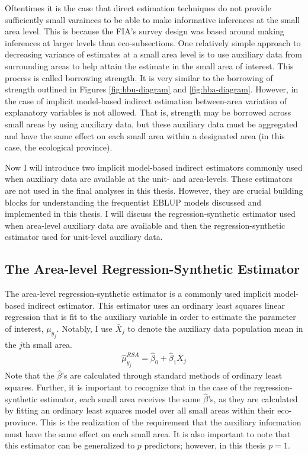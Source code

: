 \documentclass[12pt,twoside]{reedthesis}
\begin{document}
Oftentimes it is the case that direct estimation techniques do not provide sufficiently small varainces to be able to make informative inferences at the small area level. This is because the FIA's survey design was based around making inferences at larger levels than eco-subsections. One relatively simple approach to decreasing variance of estimates at a small area level is to use auxiliary data from surrounding areas to help attain the estimate in the small area of interest. This process is called borrowing strength. It is very similar to the borrowing of strength outlined in Figures \ref{fig:hbu-diagram} and \ref{fig:hba-diagram}. However, in the case of implicit model-based indirect estimation between-area variation of explanatory variables is not allowed. That is, strength may be borrowed across small areas by using auxiliary data, but these auxiliary data must be aggregated and have the same effect on each small area within a designated area (in this case, the ecological province).

Now I will introduce two implicit model-based indirect estimators commonly used when auxiliary data are available at the unit- and area-levels. These estimators are not used in the final analyses in this thesis. However, they are crucial building blocks for understanding the frequentist EBLUP models discussed and implemented in this thesis. I will discuss the regression-synthetic estimator used when area-level auxiliary data are available and then the regression-synthetic estimator used for unit-level auxiliary data.

\hypertarget{the-area-level-regression-synthetic-estimator}{%
\subsection{The Area-level Regression-Synthetic Estimator}\label{the-area-level-regression-synthetic-estimator}}

The area-level regression-synthetic estimator is a commonly used implicit model-based indirect estimator. This estimator uses an ordinary least squares linear regression that is fit to the auxiliary variable in order to estimate the parameter of interest, \(\mu_{y_j}\). Notably, I use \(\bar X_j\) to denote the auxiliary data population mean in the \(j\)th small area.
\begin{align}
\hat\mu_{y_j}^{RSA} = \hat\beta_0 + \hat\beta_1 \bar X_{j}
\end{align}
Note that the \(\hat \beta\)'s are calculated through standard methods of ordinary least squares. Further, it is important to recognize that in the case of the regression-synthetic estimator, each small area receives the same \(\hat\beta\)'s, as they are calculated by fitting an ordinary least squares model over all small areas within their eco-province. This is the realization of the requirement that the auxiliary information must have the same effect on each small area. It is also important to note that this estimator can be generalized to \(p\) predictors; however, in this thesis \(p=1\).
\end{document}
